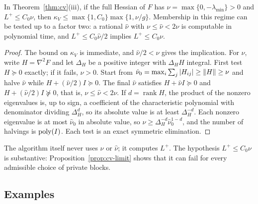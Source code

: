 \begin{corollary}\label{cor:cv-nu}
In Theorem~\ref{thm:cv}(iii), if the full Hessian of $F$ has
$\nu=\max\{0,-\lambda_{\min}\}>0$ and $L^+\le C_0\nu$, then
$\kappa_V\le\max\{1,C_0\}\max\{1,\nu/g\}$. Membership in this regime can be
tested up to a factor two: a rational $\hat\nu$ with $\nu\le\hat\nu<2\nu$ is
computable in polynomial time, and $L^+\le C_0\hat\nu/2$ implies
$L^+\le C_0\nu$.
\end{corollary}

\begin{proof}
The bound on $\kappa_V$ is immediate, and $\hat\nu/2<\nu$ gives the
implication. For $\hat\nu$, write $H=\nabla^2F$ and let $\Delta_H$ be a
positive integer with $\Delta_HH$ integral. First test $H\succeq0$ exactly;
if it fails, $\nu>0$. Start from $\hat\nu_0=\max_i\sum_j|H_{ij}|\ge\lVert H\rVert\ge\nu$ and halve $\hat\nu$ while $H+(\hat\nu/2)I\succeq0$. The final
$\hat\nu$ satisfies $H+\hat\nu I\succeq0$ and $H+(\hat\nu/2)I\not\succeq0$,
that is, $\nu\le\hat\nu<2\nu$. If $d=\operatorname{rank}H$, the product of
the nonzero eigenvalues is, up to sign, a coefficient of the characteristic
polynomial with denominator dividing $\Delta_H^d$, so its absolute value is
at least $\Delta_H^{-d}$. Each nonzero eigenvalue is at most $\hat\nu_0$ in
absolute value, so $\nu\ge\Delta_H^{-d}\hat\nu_0^{1-d}$, and the number of
halvings is $\operatorname{poly}(I)$. Each test is an exact symmetric elimination.
\end{proof}

The algorithm itself never uses $\nu$ or $\hat\nu$; it computes $L^+$. The
hypothesis $L^+\le C_0\nu$ is substantive: Proposition~\ref{prop:cv-limit}
shows that it can fail for every admissible choice of private blocks.

\subsection{Examples}

